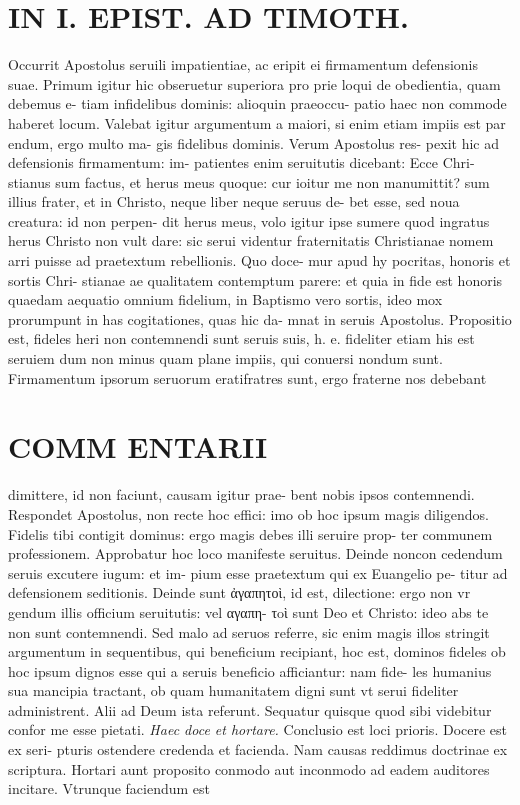 \documentclass{article}
\begin{document}
\begin{pages}
\section*{IN I. EPIST. AD TIMOTH. }
\marginpar{[ p.147 ]}\pstart Occurrit Apostolus seruili impatientiae, ac eripit ei firmamentum defensionis suae. Primum igitur hic obseruetur superiora pro prie loqui de obedientia, quam debemus e- tiam infidelibus dominis: alioquin praeoccu- patio haec non commode haberet locum. Valebat igitur argumentum a maiori, si enim etiam impiis est par endum, ergo multo ma- gis fidelibus dominis. Verum Apostolus res- pexit hic ad defensionis firmamentum: im- patientes enim seruitutis dicebant: Ecce Chri- stianus sum factus, et herus meus quoque: cur ioitur me non manumittit? sum illius frater, et in Christo, neque liber neque seruus de- bet esse, sed noua creatura: id non perpen- dit herus meus, volo igitur ipse sumere quod ingratus herus Christo non vult dare: sic serui videntur fraternitatis Christianae nomem arri puisse ad praetextum rebellionis. Quo doce- mur apud hy pocritas, honoris et sortis Chri- stianae ae qualitatem contemptum parere: et quia in fide est honoris quaedam aequatio omnium fidelium, in Baptismo vero sortis, ideo mox prorumpunt in has cogitationes, quas hic da- mnat in seruis Apostolus. Propositio est, fideles heri non contemnendi sunt seruis suis, h. e. fideliter etiam his est seruiem dum non minus quam plane impiis, qui conuersi  \pend\pstart nondum sunt. Firmamentum ipsorum seruorum eratifratres sunt, ergo fraterne nos debebant  \pend
\marginpar{[ p.148 ]}
\section*{COMM ENTARII }\pstart dimittere, id non faciunt, causam igitur prae- bent nobis ipsos contemnendi. Respondet Apostolus, non recte hoc effici: imo ob hoc ipsum magis diligendos. Fidelis tibi contigit dominus: ergo magis debes illi seruire prop- ter communem professionem. Approbatur hoc loco manifeste seruitus. Deinde noncon cedendum seruis excutere iugum: et im- pium esse praetextum qui ex Euangelio pe- titur ad defensionem seditionis. Deinde sunt ἀγαπητοὶ, id est, dilectione: ergo non vr gendum illis officium seruitutis: vel αγαπη- τoὶ sunt Deo et Christo: ideo abs te non sunt contemnendi. Sed malo ad seruos referre, sic enim magis illos stringit argumentum in sequentibus, qui beneficium recipiant, hoc est, dominos fideles ob hoc ipsum dignos esse qui a seruis beneficio afficiantur: nam fide- les humanius sua mancipia tractant, ob quam humanitatem digni sunt vt serui fideliter administrent. Alii ad Deum ista referunt. Sequatur quisque quod sibi videbitur confor me esse pietati.  \pend
\textit{Haec doce et hortare. }\pstart Conclusio est loci prioris. Docere est ex seri- pturis ostendere credenda et facienda. Nam causas reddimus doctrinae ex scriptura. Hortari aunt proposito conmodo aut inconmodo ad eadem auditores incitare. Vtrunque faciendum est  \pend

\end{pages}
\end{document}
